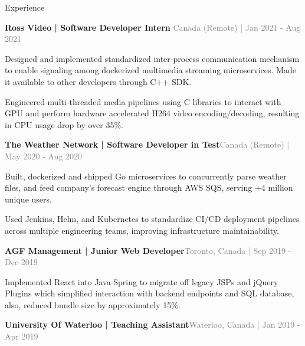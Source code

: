 \documentclass[hidelinks]{resume} %
\begin{document}
\begin{rSection}{Experience}
\begin{rSubsection}{\textbf{Ross Video | Software Developer Intern} }{\textcolor{gray}{\small Canada (Remote) | Jan 2021 - Aug 2021}}{}
    \begin{bulletpoints}
        \vspace{-.10cm}
        \item Designed and implemented standardized inter-process communication mechanism to enable signaling among dockerized multimedia streaming microservices. Made it available to other developers through C++ SDK.
        \vspace{-.13cm}
        \item Engineered multi-threaded media pipelines using C libraries to interact with GPU and perform hardware accelerated H264 video encoding/decoding, resulting in CPU usage drop by over 35\%.
        \vspace{-.10cm}
    \end{bulletpoints}
\end{rSubsection}
\begin{rSubsection}{\textbf{The Weather Network | Software Developer in Test}}{\textcolor{gray}{\small Canada (Remote) | May 2020 - Aug 2020}}{}

        \begin{bulletpoints}
            \vspace{-.10cm}
            \item Built, dockerized and shipped Go microservices to concurrently parse weather files, and feed company's forecast engine through AWS SQS, serving +4 million unique users.
            \vspace{-.13cm}
             \item Used Jenkins, Helm, and Kubernetes to standardize CI/CD deployment pipelines across multiple engineering teams, improving infrastructure maintainability.
             \vspace{-.10cm}
        \end{bulletpoints}
\end{rSubsection}
\begin{rSubsection}{\textbf{AGF Management | Junior Web Developer}}{\textcolor{gray}{\small Toronto, Canada | Sep 2019 - Dec 2019}}{}
        \par
        \begin{bulletpoints}
            \vspace{-.10cm}
            \item Implemented React into Java Spring to migrate off legacy JSPs and jQuery Plugins which simplified interaction with backend endpoints and SQL database, also, reduced bundle size by approximately 15\%.
             \vspace{-.10cm}
        \end{bulletpoints}
\end{rSubsection}
\begin{rSubsection}{\textbf{University Of Waterloo | Teaching Assistant}}{\textcolor{gray}{\small Waterloo, Canada | Jan 2019 - Apr 2019}}{}


\end{rSubsection}
\end{rSection}
\end{document}

